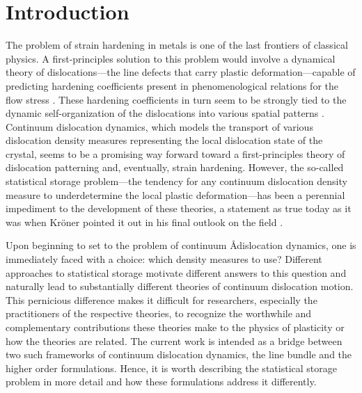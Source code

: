 \section{Introduction}
The problem of strain hardening in metals is one of the last frontiers of classical physics. A first-principles solution to this problem would involve a dynamical theory of dislocations---the line defects that carry plastic deformation---capable of predicting hardening coefficients present in phenomenological relations for the flow stress \cite{kocksPhysicsPhenomenologyStrain2003}. These hardening coefficients in turn seem to be strongly tied to the dynamic self-organization of the dislocations into various spatial patterns \cite{sauzayScalingLawsDislocation2011}. Continuum dislocation dynamics, which models the transport of various dislocation density measures representing  the local dislocation state of the crystal, seems to be a promising way forward toward a first-principles theory of dislocation patterning and, eventually, strain hardening. However, the so-called statistical storage problem—the tendency for any continuum dislocation density measure to underdetermine the local plastic deformation—has been a perennial impediment to the development of these theories, a statement as true today as it was when Kr\"{o}ner pointed it out in his final outlook on the field \cite{Kroner2001}. 

Upon beginning to set to the problem of continuum \AA dislocation dynamics, one is immediately faced with a choice: which density measures to use? Different approaches to statistical storage motivate different answers to this question and naturally lead to substantially different theories of continuum dislocation motion.
This pernicious difference makes it difficult for researchers, especially the practitioners of the respective theories, to recognize the worthwhile and complementary contributions these theories make to the physics of plasticity or how the theories are related. The current work is intended as a bridge between two such frameworks of continuum dislocation dynamics, the line bundle  \cite{andersonDislocationCorrelationsContinuum2024} and the higher order  \cite{Hochrainer2015} formulations. Hence, it is worth describing the statistical storage problem in more detail and how these formulations address it differently.

